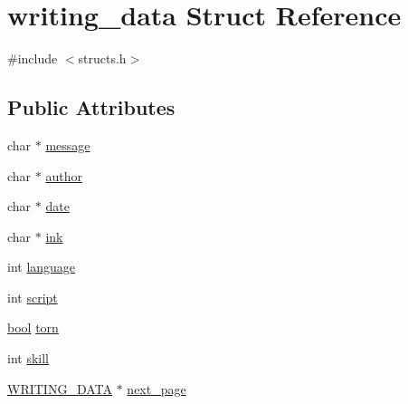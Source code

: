 \hypertarget{structwriting__data}{\section{writing\-\_\-data Struct Reference}
\label{structwriting__data}
}


{\ttfamily \#include $<$structs.\-h$>$}

\subsection*{Public Attributes}
\begin{DoxyCompactItemize}
\item 
char $\ast$ \hyperlink{structwriting__data_a84940ea582ca31116e5e0f4745ed1c74}{message}
\item 
char $\ast$ \hyperlink{structwriting__data_a9129b7e95050122469d4f55b97f88aa5}{author}
\item 
char $\ast$ \hyperlink{structwriting__data_ac155d771cd707ded96c253da837111d1}{date}
\item 
char $\ast$ \hyperlink{structwriting__data_ae6042cc8593e6b92b63704ba71a38adb}{ink}
\item 
int \hyperlink{structwriting__data_a6c24b92af8363e7e5519ab1fbcd860c3}{language}
\item 
int \hyperlink{structwriting__data_a05f9528e28940d5de9e5f4c8387b5670}{script}
\item 
\hyperlink{structs_8h_ad5c9d4ba3dc37783a528b0925dc981a0}{bool} \hyperlink{structwriting__data_afabab5b644ad0e669286c930131177a9}{torn}
\item 
int \hyperlink{structwriting__data_a8752da7cd404f940f5168e2f805d2de9}{skill}
\item 
\hyperlink{structs_8h_aa211db6b081f782264d7abea0ab25025}{W\-R\-I\-T\-I\-N\-G\-\_\-\-D\-A\-T\-A} $\ast$ \hyperlink{structwriting__data_ab39fee813d85da5295d94fd8ad12be33}{next\-\_\-page}
\end{DoxyCompactItemize}


